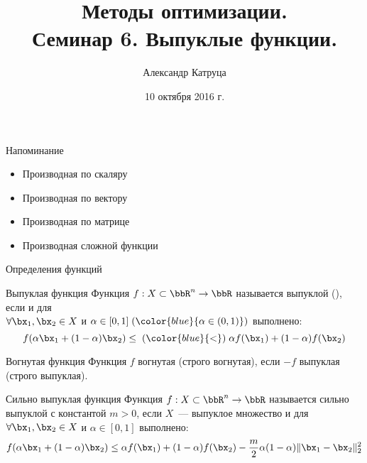 \documentclass[12pt,russian]{beamer}
\title[Семинар 6]{Методы оптимизации. \\
 Семинар 6. Выпуклые функции.}
\author{Александр Катруца}
\institute{Московский физико-технический институт,\\
Факультет Управления и Прикладной Математики}
\date{10 октября 2016 г.}
\begin{document}
\begin{frame}
\maketitle
\end{frame}

\begin{frame}{Напоминание}
\begin{itemize}
\item Производная по скаляру
\item Производная по вектору
\item Производная по матрице
\item Производная сложной функции
\end{itemize}
\end{frame}

\begin{frame}{Определения функций}
\small
\begin{block}{Выпуклая функция}
Функция $f: X \subset \bbR^n \rightarrow \bbR$ называется выпуклой ({\color{blue}{строго выпуклой}}), если {\color{red}{$X$~--- выпуклое множество}} и для \\ 
$\forall \bx_1, \bx_2 \in X$ и $\alpha \in [0, 1] \; ({\color{blue}{\alpha \in (0, 1)}})$  выполнено:
\vspace{-4mm}
\[
f(\alpha \bx_1 + (1 - \alpha)\bx_2) \leq \; ({\color{blue}{<}}) \; \alpha f(\bx_1) + (1 - \alpha)f(\bx_2)
\]
\end{block}

\begin{block}{Вогнутая функция}
Функция $f$ вогнутая (строго вогнутая), если $-f$ выпуклая (строго выпуклая).
\end{block}

\begin{block}{Сильно выпуклая функция}
Функция $f: X \subset \bbR^n \rightarrow \bbR$ называется сильно  выпуклой с константой $m > 0$, если $X$~--- выпуклое множество и для $\forall \bx_1, \bx_2 \in X$ и $\alpha \in [0, 1]$  выполнено:
\vspace{-4mm}
\[
f(\alpha \bx_1 + (1 - \alpha)\bx_2) \leq \alpha f(\bx_1) + (1 - \alpha)f(\bx_2) - \frac{m}{2} \alpha (1 - \alpha) \| \bx_1 - \bx_2 \|_2^2
\]
\end{block}

\end{frame}
\end{document}
